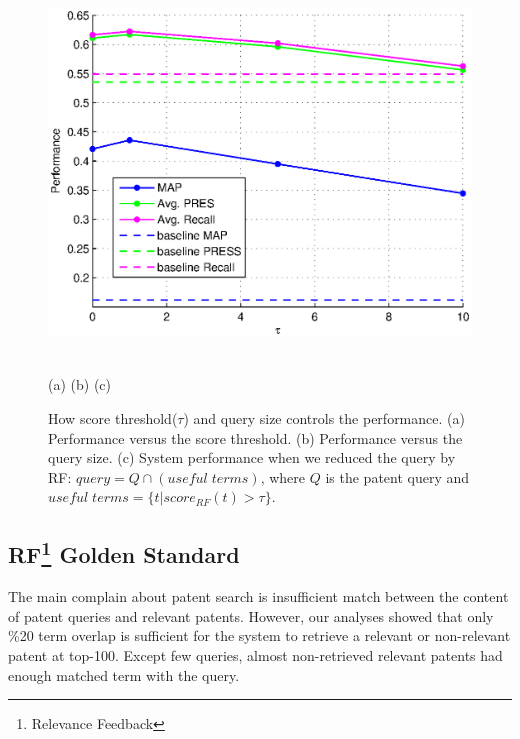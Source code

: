 \documentclass{sig-alternate}
\begin{document}
\begin{figure}
\begin{center}
\hfill
\begin{minipage}[b]{0.3\linewidth}
\includegraphics[width=\linewidth]{figs/opt-patentquery-tau.eps}
\end{minipage}
\vspace{-0.5mm}\\
 \hspace{2mm}(a) \hspace{55mm}(b) \hspace{58mm} (c)
\caption{\footnotesize
How score threshold($\tau$) and query size controls the performance.
(a) Performance versus the score threshold. (b) Performance versus the query size. (c) System performance when we reduced the query by RF: $ query = Q\cap (useful \; terms) $, where $ Q $ is the patent query and $ useful\; terms = \{t| score_{RF}(t)>\tau\} $.}
\vspace{-4mm}
\end{center}
\label{fig:control}
\end{figure}
\subsection{RF\protect\footnote{Relevance Feedback} Golden Standard}
The main complain about patent search is insufficient match between the content of patent queries and relevant
patents\cite{lupu2013patent}\cite{magdy2012toward}. However, our analyses showed that only \%20 term overlap is sufficient for the system to retrieve a relevant or non-relevant patent at top-100. Except few queries, almost non-retrieved relevant patents had enough matched term with the query. 
\end{document}
